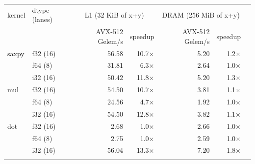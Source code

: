 \begin{tabular}{llrrrrr}
\toprule
kernel & dtype (lanes) & \multicolumn{2}{c}{L1 (32 KiB of x+y)} & \multicolumn{2}{c}{DRAM (256 MiB of x+y)} & \\
 & & AVX-512 Gelem/s & speedup & AVX-512 Gelem/s & speedup & \\
\midrule
saxpy & f32 (16) & 56.58 & 10.7$\times$ & 5.20 & 1.2$\times$ & \\
 & f64 (8) & 31.81 & 6.3$\times$ & 2.64 & 1.0$\times$ & \\
 & i32 (16) & 50.42 & 11.8$\times$ & 5.20 & 1.3$\times$ & \\
\addlinespace
mul & f32 (16) & 54.50 & 10.7$\times$ & 3.81 & 1.1$\times$ & \\
 & f64 (8) & 24.56 & 4.7$\times$ & 1.92 & 1.0$\times$ & \\
 & i32 (16) & 54.50 & 12.8$\times$ & 3.82 & 1.1$\times$ & \\
\addlinespace
dot & f32 (16) & 2.68 & 1.0$\times$ & 2.66 & 1.0$\times$ & \\
 & f64 (8) & 2.75 & 1.0$\times$ & 2.59 & 1.0$\times$ & \\
 & i32 (16) & 56.04 & 13.3$\times$ & 7.20 & 1.8$\times$ & \\
\addlinespace
\bottomrule
\end{tabular}
